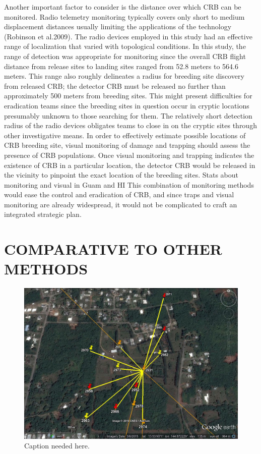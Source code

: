 \documentclass[11pt,letterpaper]{scrartcl}
\begin{document}
Another important factor to consider is the distance over which CRB can be monitored. Radio telemetry monitoring typically covers only short to medium displacement distances usually limiting the applications of the technology (Robinson et al.2009). The radio devices employed in this study had an effective range of localization that varied with topological conditions. In this study, the range of detection was appropriate for monitoring since the overall CRB flight distance from release sites to landing sites ranged from 52.8 meters to 564.6 meters. This range also roughly delineates a radius for breeding site discovery from released CRB; the detector CRB must be released no further than approximately 500 meters from breeding sites. This might present difficulties for eradication teams since the breeding sites in question occur in cryptic locations presumably unknown to those searching for them. The relatively short detection radius of the radio devices obligates teams to close in on the cryptic sites through other investigative means. In order to effectively estimate possible locations of CRB breeding site, visual monitoring of damage and trapping should assess the presence of CRB populations. Once visual monitoring and trapping indicates the existence of CRB in a particular location, the detector CRB would be released in the vicinity to pinpoint the exact location of the breeding sites. Stats about monitoring and visual in Guam and HI This combination of monitoring methods would ease the control and eradication of CRB, and since traps and visual monitoring are already widespread, it would not be complicated to craft an integrated strategic plan. 

\section*{COMPARATIVE TO OTHER METHODS}




\begin{figure}[p]
\includegraphics[width=\textwidth]{yigo_tracks.jpg}
\caption{\label{fig:yigo_tracks}Caption needed here.}
\end{figure}
\end{document}
